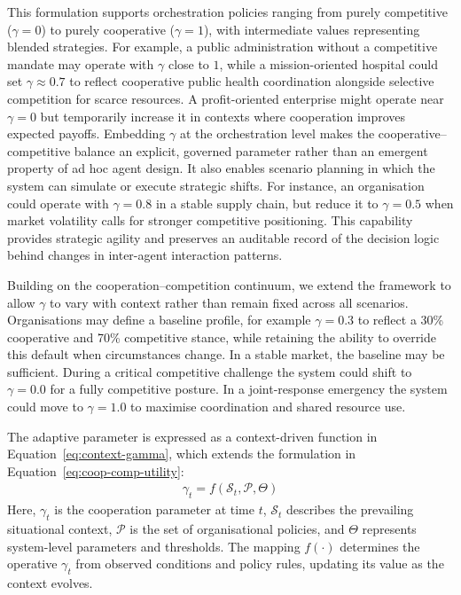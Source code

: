 \documentclass[oneside,10pt]{swissi}
\begin{document}
This formulation supports orchestration policies ranging from purely competitive ($\gamma = 0$) to purely cooperative ($\gamma = 1$), with intermediate values representing blended strategies. For example, a public administration without a competitive mandate may operate with $\gamma$ close to $1$, while a mission-oriented hospital could set $\gamma \approx 0.7$ to reflect cooperative public health coordination alongside selective competition for scarce resources. A profit-oriented enterprise might operate near $\gamma = 0$ but temporarily increase it in contexts where cooperation improves expected payoffs. Embedding $\gamma$ at the orchestration level makes the cooperative–competitive balance an explicit, governed parameter rather than an emergent property of ad hoc agent design. It also enables scenario planning in which the system can simulate or execute strategic shifts. For instance, an organisation could operate with $\gamma = 0.8$ in a stable supply chain, but reduce it to $\gamma = 0.5$ when market volatility calls for stronger competitive positioning. This capability provides strategic agility and preserves an auditable record of the decision logic behind changes in inter-agent interaction patterns.

Building on the cooperation–competition continuum, we extend the framework to allow $\gamma$ to vary with context rather than remain fixed across all scenarios. Organisations may define a baseline profile, for example $\gamma = 0.3$ to reflect a 30\% cooperative and 70\% competitive stance, while retaining the ability to override this default when circumstances change. In a stable market, the baseline may be sufficient. During a critical competitive challenge the system could shift to $\gamma = 0.0$ for a fully competitive posture. In a joint-response emergency the system could move to $\gamma = 1.0$ to maximise coordination and shared resource use.

The adaptive parameter is expressed as a context-driven function in Equation~\eqref{eq:context-gamma}, which extends the formulation in Equation~\eqref{eq:coop-comp-utility}:
\begin{align}
\gamma_t = f(\mathcal{S}_t, \mathcal{P}, \Theta) \label{eq:context-gamma}
\end{align}
Here, $\gamma_t$ is the cooperation parameter at time $t$, $\mathcal{S}_t$ describes the prevailing situational context, $\mathcal{P}$ is the set of organisational policies, and $\Theta$ represents system-level parameters and thresholds. The mapping $f(\cdot)$ determines the operative $\gamma_t$ from observed conditions and policy rules, updating its value as the context evolves.
\end{document}
